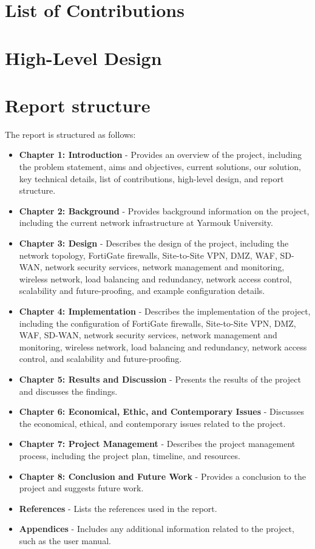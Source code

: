\documentclass[12pt]{report}
\begin{document}
\section{List of Contributions}
\section{High-Level Design}
\section{Report structure}
The report is structured as follows:
\begin{itemize}
    \item \textbf{Chapter 1: Introduction} - Provides an overview of the project, including the problem statement, aims and objectives, current solutions, our solution, key technical details, list of contributions, high-level design, and report structure.
    \item \textbf{Chapter 2: Background} - Provides background information on the project, including the current network infrastructure at Yarmouk University.
    \item \textbf{Chapter 3: Design} - Describes the design of the project, including the network topology, FortiGate firewalls, Site-to-Site VPN, DMZ, WAF, SD-WAN, network security services, network management and monitoring, wireless network, load balancing and redundancy, network access control, scalability and future-proofing, and example configuration details.
    \item \textbf{Chapter 4: Implementation} - Describes the implementation of the project, including the configuration of FortiGate firewalls, Site-to-Site VPN, DMZ, WAF, SD-WAN, network security services, network management and monitoring, wireless network, load balancing and redundancy, network access control, and scalability and future-proofing.
    \item \textbf{Chapter 5: Results and Discussion} - Presents the results of the project and discusses the findings.
    \item \textbf{Chapter 6: Economical, Ethic, and Contemporary Issues} - Discusses the economical, ethical, and contemporary issues related to the project.
    \item \textbf{Chapter 7: Project Management} - Describes the project management process, including the project plan, timeline, and resources.
    \item \textbf{Chapter 8: Conclusion and Future Work} - Provides a conclusion to the project and suggests future work.
    \item \textbf{References} - Lists the references used in the report.
    \item \textbf{Appendices} - Includes any additional information related to the project, such as the user manual.
\end{itemize}
\end{document}

